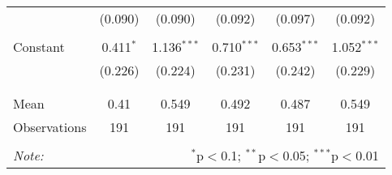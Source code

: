 \begin{tabular}{@{\extracolsep{5pt}}lccccc}
  & (0.090) & (0.090) & (0.092) & (0.097) & (0.092) \\ 
  & & & & & \\ 
 Constant & 0.411$^{*}$ & 1.136$^{***}$ & 0.710$^{***}$ & 0.653$^{***}$ & 1.052$^{***}$ \\ 
  & (0.226) & (0.224) & (0.231) & (0.242) & (0.229) \\ 
  & & & & & \\ 
\hline \\[-1.8ex] 
Mean & 0.41 & 0.549 & 0.492 & 0.487 & 0.549 \\ 
Observations & 191 & 191 & 191 & 191 & 191 \\ 
\hline 
\hline \\[-1.8ex] 
\textit{Note:}  & \multicolumn{5}{r}{$^{*}$p$<$0.1; $^{**}$p$<$0.05; $^{***}$p$<$0.01} \\ 
\end{tabular} 
